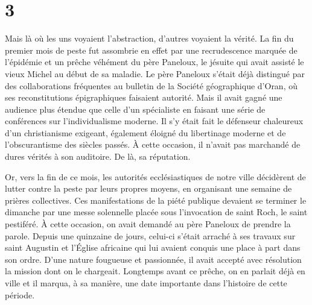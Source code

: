 \documentclass[french,twoside]{book} %
\begin{document}
\section[{3}]{3}
\noindent Mais là où les uns voyaient l’abstraction, d’autres voyaient la vérité. La fin du premier mois de peste fut assombrie en effet par une recrudescence marquée de l’épidémie et un prêche véhément du père Paneloux, le jésuite qui avait assisté le vieux Michel au début de sa maladie. Le père Paneloux s’était déjà distingué par des collaborations fréquentes au bulletin de la Société géographique d’Oran, où ses reconstitutions épigraphiques faisaient autorité. Mais il avait gagné une audience plus étendue que celle d’un spécialiste en faisant une série de conférences sur l’individualisme moderne. Il s’y était fait le défenseur chaleureux d’un christianisme exigeant, également éloigné du libertinage moderne et de l’obscurantisme des siècles passés. À cette occasion, il n’avait pas marchandé de dures vérités à son auditoire. De là, sa réputation.\par
Or, vers la fin de ce mois, les autorités ecclésiastiques de notre ville décidèrent de lutter contre la peste par leurs propres moyens, en organisant une semaine de prières collectives. Ces manifestations de la piété publique devaient se terminer le dimanche par une messe solennelle placée sous l’invocation de saint Roch, le saint pestiféré. À cette occasion, on avait demandé au père Paneloux de prendre la parole. Depuis une quinzaine de jours, celui-ci s’était arraché à ses travaux sur saint Augustin et l’Église africaine qui lui avaient conquis une place à part dans son ordre. D’une nature fougueuse et passionnée, il avait accepté avec résolution la mission dont on le chargeait. Longtemps avant ce prêche, on en parlait déjà en ville et il marqua, à sa manière, une date importante dans l’histoire de cette période.\par
\end{document}
